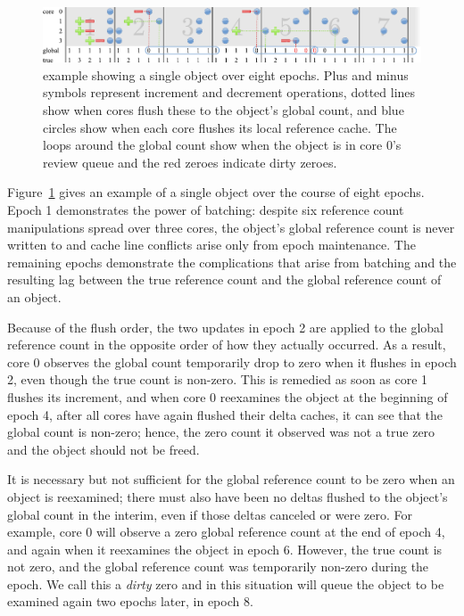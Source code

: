 \begin{figure}
  \centering
  \includegraphics[width=\textwidth]{figures/refcache.pdf}
  \caption{ example showing a single object over eight
    epochs.  Plus and minus symbols represent increment and decrement
    operations, dotted lines show when cores flush these to the object's
    global count, and blue circles show when each core flushes its
    local reference cache.  The loops around the global count show
    when the object is in core 0's review queue and
    the red zeroes indicate dirty zeroes.}
  \label{fig:refcache-ex}
\end{figure}

Figure~\ref{fig:refcache-ex} gives an example of a single object over
the course of eight epochs.  Epoch 1 demonstrates the power of
batching: despite six reference count manipulations spread over three
cores, the object's global reference count is never written to and
cache line conflicts arise only from epoch maintenance.  The
remaining epochs demonstrate the complications that arise from
batching and the resulting lag between the true reference count and
the global reference count of an object.

Because of the flush order, the two updates in epoch 2 are applied to
the global reference count in the opposite order of how they actually
occurred.  As a result, core 0 observes the global count temporarily
drop to zero when it flushes in epoch 2, even though the true count is
non-zero.  This is remedied as soon as core 1 flushes its increment,
and when core 0 reexamines the object at the beginning of epoch 4,
after all cores have again flushed their delta caches, it can see
that the global count is non-zero; hence, the zero count it observed
was not a true zero and the object should not be freed.

It is necessary but not sufficient for the global reference count to
be zero when an object is reexamined; there must also have been no
deltas flushed to the object's global count in the interim, even if
those deltas canceled or were zero.
%
For example, core 0 will observe a zero global reference count
at the end of epoch 4, and again when it reexamines the object in
epoch 6.  However, the true count is not zero, and the global
reference count was temporarily non-zero during the epoch.  We call
this a \emph{dirty} zero and in this situation  will
queue the object to be examined again two epochs later, in epoch 8.

